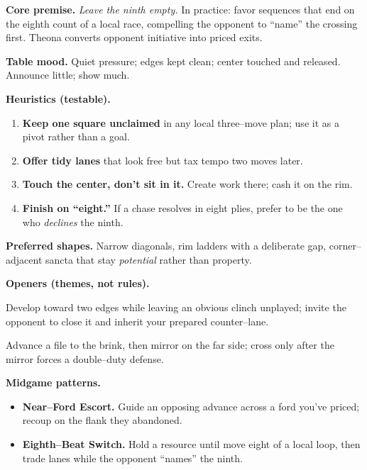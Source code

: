 \documentclass[11pt]{article}
\numberwithin{equation}{section} %
\theoremstyle{plain} %
\theoremstyle{definition} %
\theoremstyle{remark} %
\begin{document}
\medskip
\noindent\textbf{Core premise.} \textit{Leave the ninth empty.} In practice: favor sequences that end on the eighth count of a local race, compelling the opponent to “name” the crossing first. Theona converts opponent initiative into priced exits.

\medskip
\noindent\textbf{Table mood.} Quiet pressure; edges kept clean; center touched and released. Announce little; show much.

\medskip
\noindent\textbf{Heuristics (testable).}
\begin{enumerate}\setlength\itemsep{0.25em}
  \item \textbf{Keep one square unclaimed} in any local three–move plan; use it as a pivot rather than a goal.
  \item \textbf{Offer tidy lanes} that look free but tax tempo two moves later.
  \item \textbf{Touch the center, don’t sit in it.} Create work there; cash it on the rim.
  \item \textbf{Finish on “eight.”} If a chase resolves in eight plies, prefer to be the one who \emph{declines} the ninth.
\end{enumerate}

\medskip
\noindent\textbf{Preferred shapes.} Narrow diagonals, rim ladders with a deliberate gap, corner–adjacent sancta that stay \emph{potential} rather than property.

\medskip
\noindent\textbf{Openers (themes, not rules).}
\begin{description}\setlength\itemsep{0.35em}
  \item[\textit{Empty Chair.}] Develop toward two edges while leaving an obvious clinch unplayed; invite the opponent to close it and inherit your prepared counter–lane.
  \item[\textit{Unpoured Cup.}] Advance a file to the brink, then mirror on the far side; cross only after the mirror forces a double–duty defense.
\end{description}

\medskip
\noindent\textbf{Midgame patterns.}
\begin{itemize}\setlength\itemsep{0.25em}
  \item \textbf{Near–Ford Escort.} Guide an opposing advance across a ford you’ve priced; recoup on the flank they abandoned.
  \item \textbf{Eighth–Beat Switch.} Hold a resource until move eight of a local loop, then trade lanes while the opponent “names” the ninth.
\end{itemize}
\end{document}
